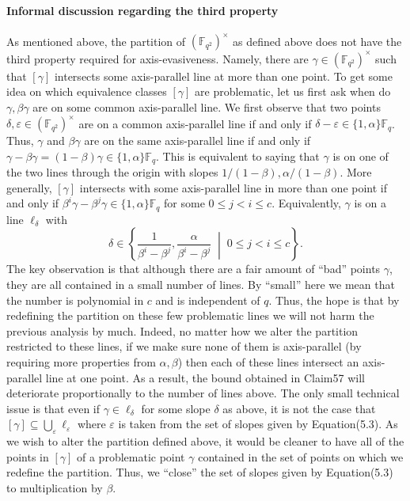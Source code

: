 \documentclass[10pt,a4paper]{article}
\begin{document}
\paragraph{Informal discussion regarding the third property}
As mentioned above, the partition of $(\mathbb F_{q^2})^\times$ as defined above does not have the third property required for axis-evasiveness. Namely, there are $\gamma\in(\mathbb F_{q^2})^\times$ such that $[\gamma]$ intersects some axis-parallel line at more than one point. To get some idea on which equivalence classes $[\gamma]$ are problematic, let us first ask when do $\gamma,\beta\gamma$ are on some common axis-parallel line. We first observe that two points $\delta,\varepsilon\in(\mathbb F_{q^2})^\times$ are on a common axis-parallel line if and only if $\delta-\varepsilon\in\{1,\alpha\}\mathbb F_q$. Thus, $\gamma$ and $\beta\gamma$ are on the same axis-parallel line if and only if $\gamma-\beta\gamma=(1-\beta)\gamma\in\{1,\alpha\}\mathbb F_q$. This is equivalent to saying that $\gamma$ is on one of the two lines through the origin with slopes $1/(1-\beta),\alpha/(1-\beta)$.
More generally, $[\gamma]$ intersects with some axis-parallel line in more than one point if and only if $\beta^i\gamma-\beta^j\gamma\in\{1,\alpha\}\mathbb F_q$ for some $0\leq j<i\leq c$. Equivalently, $\gamma$ is on a line $\ell_\delta$ with
\begin{equation}\delta\in\left\{\frac1{\beta^i-\beta^j},\frac\alpha{\beta^i-\beta^j}\;\middle|\;0\leq j<i\leq c\right\}.\tag{5.3}\end{equation}
The key observation is that although there are a fair amount of ``bad'' points $\gamma$, they are all contained in a small number of lines. By ``small'' here we mean that the number is polynomial in $c$ and is independent of $q$. Thus, the hope is that by redefining the partition on these few problematic lines we will not harm the previous analysis by much. Indeed, no matter how we alter the partition restricted to these lines, if we make sure none of them is axis-parallel (by requiring more properties from $\alpha,\beta$) then each of these lines intersect an axis-parallel line at one point. As a result, the bound obtained in Claim57 will deteriorate proportionally to the number of lines above.
The only small technical issue is that even if $\gamma\in\ell_\delta$ for some slope $\delta$ as above, it is not the case that $[\gamma]\subseteq\bigcup_\varepsilon\ell_\varepsilon$ where $\varepsilon$ is taken from the set of slopes given by Equation(5.3). As we wish to alter the partition defined above, it would be cleaner to have all of the points in $[\gamma]$ of a problematic point $\gamma$ contained in the set of points on which we redefine the partition. Thus, we ``close'' the set of slopes given by Equation(5.3) to multiplication by $\beta$.
\end{document}
